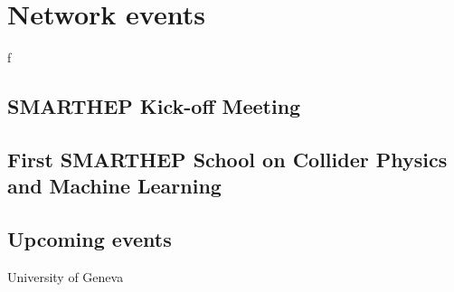 \section{Network events}
\label{events}
f



\subsection{SMARTHEP Kick-off Meeting}
\label{kick-off}



\subsection{First SMARTHEP School on Collider Physics and Machine Learning}
\label{unige-school}


\subsection{Upcoming events}
\label{upcoming}
University of Geneva